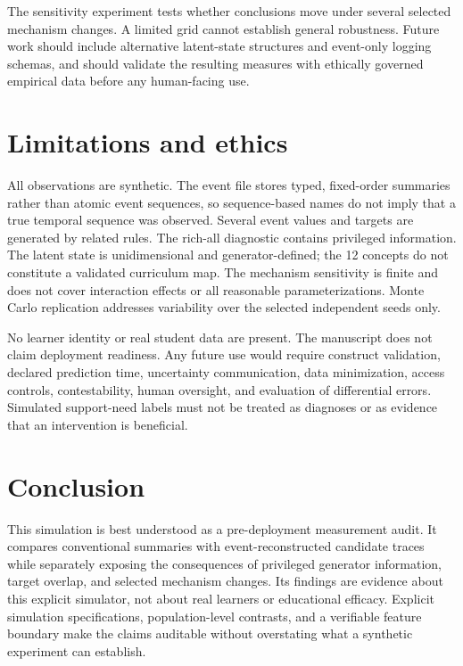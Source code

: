 \documentclass[11pt]{article}
\begin{document}
The sensitivity experiment tests whether conclusions move under several selected mechanism changes. A limited grid cannot establish general robustness. Future work should include alternative latent-state structures and event-only logging schemas, and should validate the resulting measures with ethically governed empirical data before any human-facing use.

\section{Limitations and ethics}

All observations are synthetic. The event file stores typed, fixed-order summaries rather than atomic event sequences, so sequence-based names do not imply that a true temporal sequence was observed. Several event values and targets are generated by related rules. The rich-all diagnostic contains privileged information. The latent state is unidimensional and generator-defined; the 12 concepts do not constitute a validated curriculum map. The mechanism sensitivity is finite and does not cover interaction effects or all reasonable parameterizations. Monte Carlo replication addresses variability over the selected independent seeds only.

No learner identity or real student data are present. The manuscript does not claim deployment readiness. Any future use would require construct validation, declared prediction time, uncertainty communication, data minimization, access controls, contestability, human oversight, and evaluation of differential errors. Simulated support-need labels must not be treated as diagnoses or as evidence that an intervention is beneficial.

\section{Conclusion}

This simulation is best understood as a pre-deployment measurement audit. It compares conventional summaries with event-reconstructed candidate traces while separately exposing the consequences of privileged generator information, target overlap, and selected mechanism changes. Its findings are evidence about this explicit simulator, not about real learners or educational efficacy. Explicit simulation specifications, population-level contrasts, and a verifiable feature boundary make the claims auditable without overstating what a synthetic experiment can establish.
\end{document}
